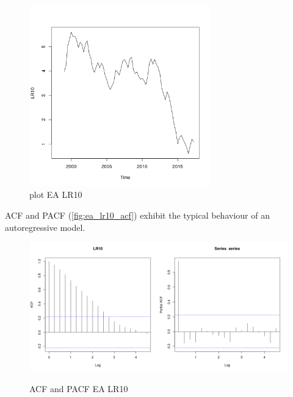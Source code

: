 \documentclass[10pt]{article}
\begin{document}
\begin{figure}[h!]
\centering
\includegraphics[width = 0.7\textwidth]{../plots/ea_LR10}
\caption{plot EA LR10}
\label{fig:ea_lr10}
\end{figure}

ACF and PACF (\autoref{fig:ea_lr10_acf}) exhibit the typical behaviour of an autoregressive model.

\begin{figure}[h!]
\centering
\includegraphics[width = 0.5\textwidth]{../acf/ea_LR10}\includegraphics[width = 0.5\textwidth]{../pacf/ea_LR10}
\caption{ACF and PACF EA LR10}
\label{fig:ea_lr10_acf}
\end{figure}
\end{document}
